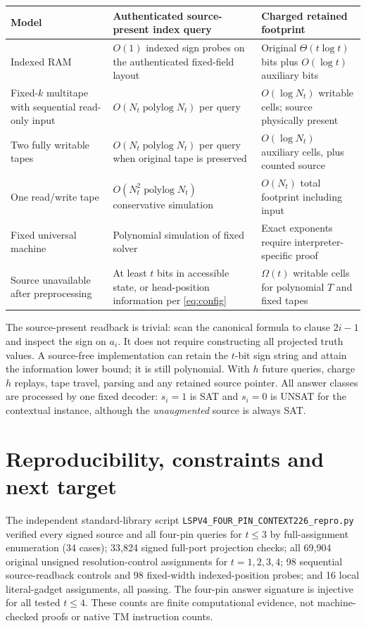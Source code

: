 \documentclass[11pt]{article}
\begin{document}
\begin{center}
\begin{tabular}{p{.22\linewidth}p{.30\linewidth}p{.37\linewidth}}
\toprule Model & Authenticated source-present index query & Charged retained footprint \\\midrule
Indexed RAM & $O(1)$ indexed sign probes on the authenticated fixed-field layout & Original $\Theta(t\log t)$ bits plus $O(\log t)$ auxiliary bits \\
Fixed-$k$ multitape with sequential read-only input & $O(N_t\operatorname{polylog}N_t)$ per query & $O(\log N_t)$ writable cells; source physically present \\
Two fully writable tapes & $O(N_t\operatorname{polylog}N_t)$ per query when original tape is preserved & $O(\log N_t)$ auxiliary cells, plus counted source \\
One read/write tape & $O(N_t^2\operatorname{polylog}N_t)$ conservative simulation & $O(N_t)$ total footprint including input \\
Fixed universal machine & Polynomial simulation of fixed solver & Exact exponents require interpreter-specific proof \\
Source unavailable after preprocessing & At least $t$ bits in accessible state, or head-position information per \eqref{eq:config} & $\Omega(t)$ writable cells for polynomial $T$ and fixed tapes \\
\bottomrule
\end{tabular}
\end{center}
The source-present readback is trivial: scan the canonical formula to clause $2i-1$ and inspect the sign on $a_i$. It does not require constructing all projected truth values. A source-free implementation can retain the $t$-bit sign string and attain the information lower bound; it is still polynomial. With $h$ future queries, charge $h$ replays, tape travel, parsing and any retained source pointer. All answer classes are processed by one fixed decoder: $s_i=1$ is SAT and $s_i=0$ is UNSAT for the contextual instance, although the \emph{unaugmented} source is always SAT.

\section{Reproducibility, constraints and next target}
The independent standard-library script \texttt{LSPV4\_FOUR\_PIN\_CONTEXT226\_repro.py} verified every signed source and all four-pin queries for $t\le3$ by full-assignment enumeration (34 cases); 33,824 signed full-port projection checks; all 69,904 original unsigned resolution-control assignments for $t=1,2,3,4$; 98 sequential source-readback controls and 98 fixed-width indexed-position probes; and 16 local literal-gadget assignments, all passing. The four-pin answer signature is injective for all tested $t\le4$. These counts are finite computational evidence, not machine-checked proofs or native TM instruction counts.
\end{document}
